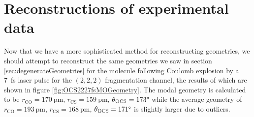 \section{Reconstructions of experimental data}
Now that we have a more sophisticated method for reconstructing geometries, we should attempt to reconstruct the same geometries we saw in section \ref{sec:degenerateGeometries} for the  molecule following Coulomb explosion by a \SI{7}{\fs} laser pulse for the $(2,2,2)$ fragmentation channel, the results of which are shown in figure \ref{fig:OCS2227fsMOGeometry}. The modal geometry is calculated to be $r_\mathrm{CO} = \SI{170}{\pico\m}$, $r_\mathrm{CS} = \SI{159}{\pm}$, $ \theta_\mathrm{OCS} = 173\degree$ while the average geometry of $r_\mathrm{CO} = \SI{193}{\pico\m}$, $r_\mathrm{CS} = \SI{168}{\pico\m}$, $ \theta_\mathrm{OCS} = 171\degree$ is slightly larger due to outliers.

